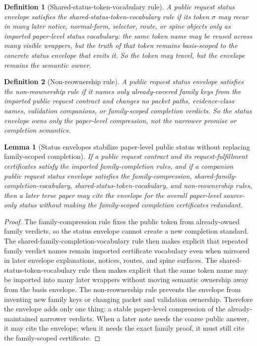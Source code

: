 \documentclass[11pt]{article}
\newtheorem{definition}{Definition}
\newtheorem{lemma}{Lemma}
\begin{document}
\begin{definition}[Shared-status-token-vocabulary rule]
A public request status envelope satisfies the \emph{shared-status-token-vocabulary rule} if its token $\sigma$ may recur in many later notice, normal-form, selector, route, or spine objects only as imported paper-level status vocabulary: the same token name may be reused across many visible wrappers, but the truth of that token remains basis-scoped to the concrete status envelope that emits it.
So the token may travel, but the envelope remains the semantic owner.
\end{definition}

\begin{definition}[Non-reownership rule]
A public request status envelope satisfies the \emph{non-reownership rule} if it names only already-covered family keys from the imported public request contract and changes no packet paths, evidence-class names, validation companions, or family-scoped completion verdicts.
So the status envelope owns only the paper-level compression, not the narrower promise or completion semantics.
\end{definition}

\begin{lemma}[Status envelopes stabilize paper-level public status without replacing family-scoped completion]
If a public request contract and its request-fulfillment certificates satisfy the imported family-completion rules, and if a companion public request status envelope satisfies the family-compression, shared-family-completion-vocabulary, shared-status-token-vocabulary, and non-reownership rules, then a later terse paper may cite the envelope for the overall paper-level source-only status without making the family-scoped completion certificates redundant.
\end{lemma}

\begin{proof}
The family-compression rule fixes the public token from already-owned family verdicts, so the status envelope cannot create a new completion standard.
The shared-family-completion-vocabulary rule then makes explicit that repeated family verdict names remain imported certificate vocabulary even when mirrored in later envelope explanations, notices, routes, and spine surfaces.
The shared-status-token-vocabulary rule then makes explicit that the same token name may be imported into many later wrappers without moving semantic ownership away from the basis envelope.
The non-reownership rule prevents the envelope from inventing new family keys or changing packet and validation ownership.
Therefore the envelope adds only one thing: a stable paper-level compression of the already-maintained narrower verdicts.
When a later note needs the coarse public answer, it may cite the envelope; when it needs the exact family proof, it must still cite the family-scoped certificate.\qedhere
\end{proof}
\end{document}
